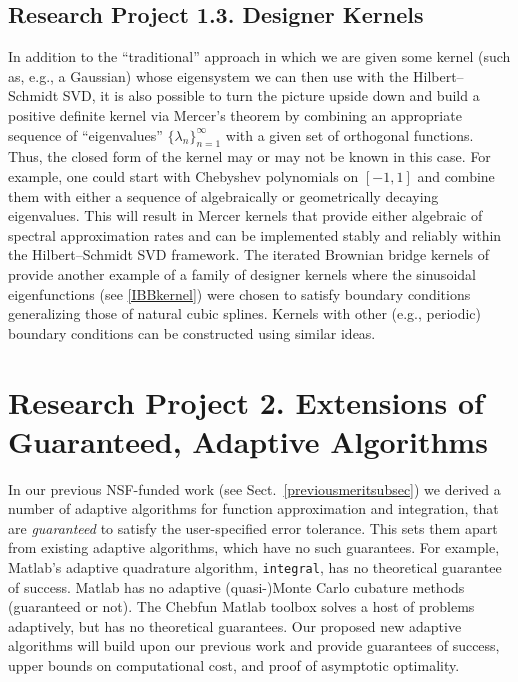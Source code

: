 \documentclass[11pt]{NSFamsart}
\newcommand{\Matlab}{{\sc Matlab}\xspace}
\begin{document}
\subsection*{Research Project 1.3. Designer Kernels}\label{SectDesignerKernels}
In addition to the ``traditional'' approach in which we are given some kernel (such as, e.g., a Gaussian) whose eigensystem we can then use with the Hilbert--Schmidt SVD, it is also possible to turn the picture upside down and build a positive definite kernel via Mercer's theorem by combining an appropriate sequence of
``eigenvalues'' $\{\lambda_n\}_{n=1}^\infty$ with a given set of orthogonal functions. Thus, the closed form of the kernel may or may not be known in this case. For example, one could start with Chebyshev polynomials on $[-1,1]$ and combine them with either a sequence of algebraically or geometrically decaying eigenvalues. This will result in Mercer kernels that provide either algebraic of spectral approximation rates and can be implemented stably and reliably within the Hilbert--Schmidt SVD framework. The iterated Brownian bridge kernels of \cite{CavorettoEtAl14} provide another example of a family of designer kernels where the sinusoidal eigenfunctions (see \eqref{IBBkernel}) were chosen to satisfy boundary conditions generalizing those of natural cubic splines. Kernels with other (e.g., periodic) boundary conditions can be constructed using similar ideas.

\section*{Research Project 2. Extensions of Guaranteed, Adaptive Algorithms}\label{SectGAIL}

In our previous NSF-funded work (see Sect.\ \ref{previousmeritsubsec}) we derived a number of  adaptive algorithms for function approximation and integration, that are \emph{guaranteed} to satisfy the user-specified error tolerance.  This sets them apart from existing adaptive algorithms, which have no such guarantees.  For example, \Matlab's adaptive quadrature algorithm, \texttt{integral}, has no theoretical guarantee of success.  \Matlab has no adaptive (quasi-)Monte Carlo cubature methods (guaranteed or not).  The Chebfun \Matlab toolbox \citep{TrefEtal14} solves a host of problems adaptively, but has no theoretical guarantees.  Our proposed new adaptive algorithms will build upon our previous work and provide guarantees of success, upper bounds on computational cost, and proof of asymptotic optimality.
\end{document}
